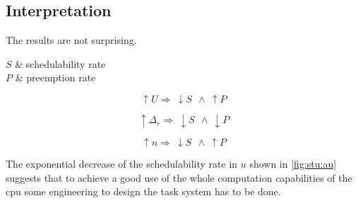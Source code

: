 \subsection{Interpretation}

The results are not surprising.

\begin{conditions}
	$S$ & schedulability rate\\
	$P$ & preemption rate
\end{conditions}

\begin{equation}
	\uparrow U \Rightarrow ~\downarrow S ~~\land ~\uparrow P
	\label{eq:U influence}
\end{equation}

\begin{equation}
	\uparrow \Delta_r \Rightarrow ~\downarrow S ~~\land ~\downarrow P
	\label{eq:d influence}
\end{equation}

\begin{equation}
	\uparrow n \Rightarrow ~\downarrow S ~~\land ~\uparrow P
	\label{eq:n influence}
\end{equation}


The exponential decrease of the schedulability rate in $u$ shown in \ref{fig:stu:au} suggests that
to achieve a good use of the whole computation capabilities of the cpu some engineering to design the task system has to be done.